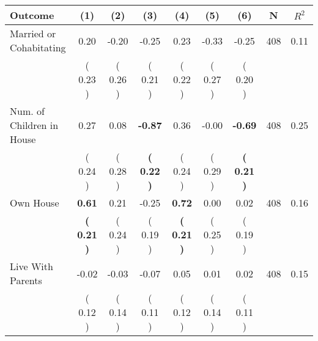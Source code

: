 \begin{tabular}{lcccccccc}
\toprule
 \textbf{Outcome} & \textbf{(1)} & \textbf{(2)} & \textbf{(3)} & \textbf{(4)} & \textbf{(5)} & \textbf{(6)} & \textbf{N} & \textbf{$ R^2$} \\
\midrule
Married or Cohabitating &      0.20 &     -0.20 &     -0.25 &      0.23 &     -0.33 &     -0.25 & 408 &       0.11 \\ 
 & (     0.23 ) & (     0.26 ) & (     0.21 ) & (     0.22 ) & (     0.27 ) & (     0.20 ) & \\
Num. of Children in House &      0.27 &      0.08 & \textbf{    -0.87} &      0.36 &     -0.00 & \textbf{    -0.69} & 408 &       0.25 \\ 
 & (     0.24 ) & (     0.28 ) & \textbf{(     0.22 )} & (     0.24 ) & (     0.29 ) & \textbf{(     0.21 )} & \\
Own House & \textbf{     0.61} &      0.21 &     -0.25 & \textbf{     0.72} &      0.00 &      0.02 & 408 &       0.16 \\ 
 & \textbf{(     0.21 )} & (     0.24 ) & (     0.19 ) & \textbf{(     0.21 )} & (     0.25 ) & (     0.19 ) & \\
Live With Parents &     -0.02 &     -0.03 &     -0.07 &      0.05 &      0.01 &      0.02 & 408 &       0.15 \\ 
 & (     0.12 ) & (     0.14 ) & (     0.11 ) & (     0.12 ) & (     0.14 ) & (     0.11 ) & \\
\bottomrule
\end{tabular}
